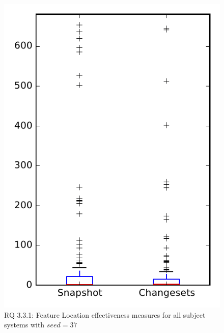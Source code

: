 
\begin{figure}
\centering
\includegraphics[height=0.4\textheight]{figures/flt_seed/rq1_overview_37}
\caption{RQ 3.3.1: Feature Location effectiveness measures for all subject systems with $seed=37$}
\label{fig:flt_seed:rq1:overview}
\end{figure}

